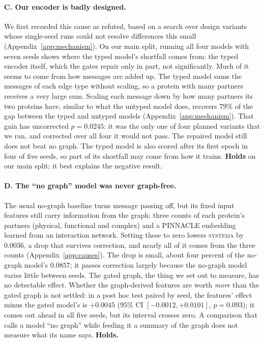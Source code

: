 \documentclass{article}
\begin{document}
\paragraph{C. Our encoder is badly designed.} We first recorded this cause as refuted, based on a search
over design variants whose single-seed runs could not resolve differences this small
(Appendix~\ref{app:mechanism}). On our main split, running all four models with seven seeds shows where the
typed model's shortfall comes from: the typed encoder itself, which the gates repair only in part, not
significantly. Much of it seems to come from how messages are added up. The typed model sums the
messages of each edge type without scaling, so a protein with many partners receives a very large sum.
Scaling each message down by how many partners its two proteins have, similar to what the untyped model
does, recovers $79\%$ of the gap between the typed and untyped models (Appendix~\ref{app:mechanism}). That
gain has uncorrected $p{=}0.0245$: it was the only one of four planned variants that we ran, and corrected
over all four it would not pass. The repaired model still does not beat no graph. The typed model is also scored after
its first epoch in four of five seeds, so part of its shortfall may come from how it trains.
\textbf{Holds} on our main split; it best explains the negative result.

\paragraph{D. The ``no graph'' model was never graph-free.} The usual no-graph baseline turns message
passing off, but its fixed input features still carry information from the graph: three counts of each
protein's partners (physical, functional and complex) and a PINNACLE embedding \citep{li2024pinnacle}
learned from an interaction network. Setting these to zero lowers \textsc{systema} by $0.0036$, a drop that
survives correction, and nearly all of it comes from the three counts (Appendix~\ref{app:causes}). The drop
is small, about four percent of the no-graph model's $0.0857$; it passes correction largely because the
no-graph model varies little between seeds. The gated graph, the thing we set out to measure, has no
detectable effect. Whether the graph-derived features are worth \emph{more} than the gated graph is not
settled: in a post hoc test paired by seed, the features' effect minus the gated model's is $+0.0045$
($95\%$ CI $[-0.0012,+0.0101]$, $p{=}0.093$); it comes out ahead in all five seeds, but its interval
crosses zero. A comparison that calls a model ``no graph'' while feeding it a summary of the graph does
not measure what its name says. \textbf{Holds.}
\end{document}
